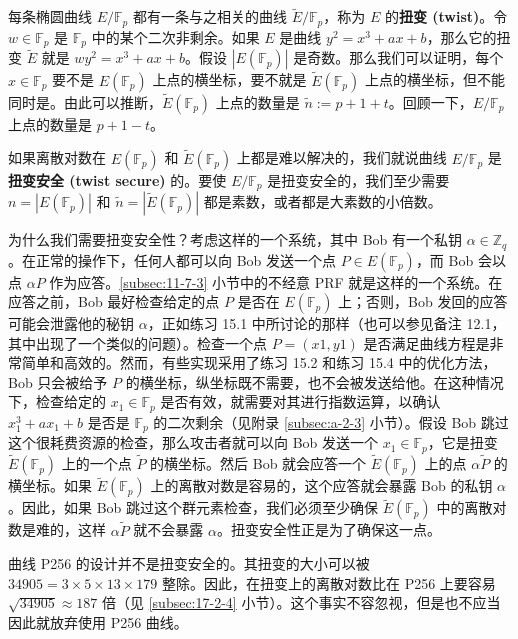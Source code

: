 \begin{snote}[扭变安全性。]
每条椭圆曲线 $E/\mathbb{F}_p$ 都有一条与之相关的曲线 $\tilde E/\mathbb{F}_p$，称为 $E$ 的\textbf{扭变 (twist)}。令 $w\in\mathbb{F}_p$ 是 $\mathbb{F}_p$ 中的某个二次非剩余。如果 $E$ 是曲线 $y^2=x^3+ax+b$，那么它的扭变 $\tilde E$ 就是 $wy^2=x^3+ax+b$。假设 $|E(\mathbb{F}_{p})|$ 是奇数。那么我们可以证明，每个 $x\in\mathbb{F}_p$ 要不是 $E(\mathbb{F}_{p})$ 上点的横坐标，要不就是 $\tilde E(\mathbb{F}_{p})$ 上点的横坐标，但不能同时是。由此可以推断，$\tilde E(\mathbb{F}_{p})$ 上点的数量是 $\tilde n:=p+1+t$。回顾一下，$E/\mathbb{F}_p$ 上点的数量是 $p+1-t$。

如果离散对数在 $E(\mathbb{F}_{p})$ 和 $\tilde E(\mathbb{F}_{p})$ 上都是难以解决的，我们就说曲线 $E/\mathbb{F}_p$ 是\textbf{扭变安全 (twist secure)} 的。要使 $E/\mathbb{F}_p$ 是扭变安全的，我们至少需要 $n=|E(\mathbb{F}_{p})|$ 和 $\tilde n= |\tilde E(\mathbb{F}_{p})|$ 都是素数，或者都是大素数的小倍数。

为什么我们需要扭变安全性？考虑这样的一个系统，其中 Bob 有一个私钥 $α\in\mathbb{Z}_q$。在正常的操作下，任何人都可以向 Bob 发送一个点 $P\in E(\mathbb{F}_{p})$，而 Bob 会以点 $\alpha P$ 作为应答。\ref{subsec:11-7-3} 小节中的不经意 PRF 就是这样的一个系统。在应答之前，Bob 最好检查给定的点 $P$ 是否在 $E(\mathbb{F}_{p})$ 上；否则，Bob 发回的应答可能会泄露他的秘钥 $\alpha$，正如练习 15.1 中所讨论的那样（也可以参见备注 12.1，其中出现了一个类似的问题）。检查一个点 $P=(x1,y1)$ 是否满足曲线方程是非常简单和高效的。然而，有些实现采用了练习 15.2 和练习 15.4 中的优化方法，Bob 只会被给予 $P$ 的横坐标，纵坐标既不需要，也不会被发送给他。在这种情况下，检查给定的 $x_1∈\mathbb{F}_p$ 是否有效，就需要对其进行指数运算，以确认 $x^3_1+ax_1+b$ 是否是 $\mathbb{F}_p$ 的二次剩余（见附录 \ref{subsec:a-2-3} 小节）。假设 Bob 跳过这个很耗费资源的检查，那么攻击者就可以向 Bob 发送一个 $x_1∈\mathbb{F}_p$，它是扭变 $\tilde E(\mathbb{F}_{p})$ 上的一个点 $\tilde P$ 的横坐标。然后 Bob 就会应答一个 $\tilde E(\mathbb{F}_{p})$ 上的点 $\alpha\tilde P$ 的横坐标。如果 $\tilde E(\mathbb{F}_{p})$ 上的离散对数是容易的，这个应答就会暴露 Bob 的私钥 $\alpha$。因此，如果 Bob 跳过这个群元素检查，我们必须至少确保 $\tilde E(\mathbb{F}_{p})$ 中的离散对数是难的，这样 $\alpha\tilde P$ 就不会暴露 $\alpha$。扭变安全性正是为了确保这一点。

曲线 P256 的设计并不是扭变安全的。其扭变的大小可以被 $34905=3×5×13×179$ 整除。因此，在扭变上的离散对数比在 P256 上要容易 $\sqrt{34905}\approx187$ 倍（见 \ref{subsec:17-2-4} 小节）。这个事实不容忽视，但是也不应当因此就放弃使用 P256 曲线。
\end{snote}

